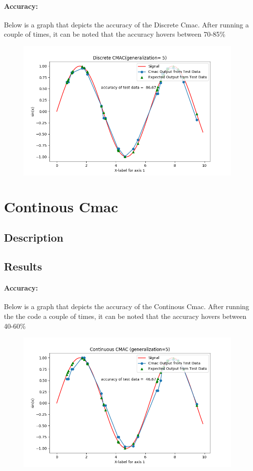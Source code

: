 \documentclass{article}
\begin{document}
  \paragraph{Accuracy:}
    Below is a graph that depicts the accuracy of the Discrete Cmac. After running a couple of times, it can 
    be noted that the accuracy hovers between 70-85\%
  \begin{figure}[h!]
    \centering
    \includegraphics[scale=0.7]{./Results/discreteAccuracy.png}
  \end{figure}
\newpage 
\section{Continous Cmac}
\subsection{Description}
\subsection{Results}
  \paragraph{Accuracy:}
    Below is a graph that depicts the accuracy of the Continous Cmac. After running the the code a couple of times, it can
    be noted that the accuracy hovers between 40-60\%
  \begin{figure}[h!]
     \centering
     \includegraphics[scale=0.65]{./Results/continousAccuracy.png}
  \end{figure}
\end{document}

